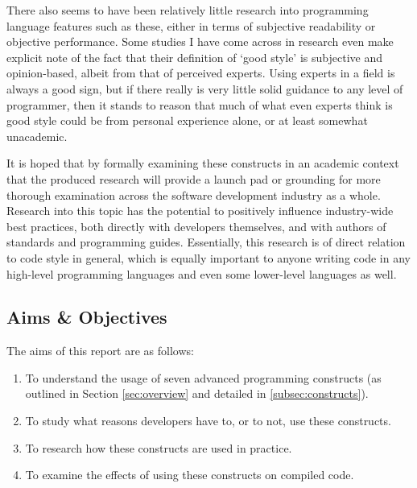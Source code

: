 \documentclass{article}
\begin{document}
        There also seems to have been relatively little research into programming language features such as these, either in terms of subjective readability or objective performance. Some studies I have come across in research even make explicit note of the fact that their definition of `good style' is subjective and opinion-based, albeit from that of perceived experts. Using experts in a field is always a good sign, but if there really is very little solid guidance to any level of programmer, then it stands to reason that much of what even experts think is good style could be from personal experience alone, or at least somewhat unacademic.
        
        It is hoped that by formally examining these constructs in an academic context that the produced research will provide a launch pad or grounding for more thorough examination across the software development industry as a whole. Research into this topic has the potential to positively influence industry-wide best practices, both directly with developers themselves, and with authors of standards and programming guides. Essentially, this research is of direct relation to code style in general, which is equally important to anyone writing code in any high-level programming languages and even some lower-level languages as well.
    \subsection{Aims \& Objectives}
    \label{subsec:aimsAndObjs}
        The aims of this report are as follows:
        \begin{enumerate}
            \item To understand the usage of seven advanced programming constructs (as outlined in Section \ref{sec:overview} and detailed in \ref{subsec:constructs}).
            \item To study what reasons developers have to, or to not, use these constructs.
            \item To research how these constructs are used in practice.
            \item To examine the effects of using these constructs on compiled code.
        \end{enumerate}
        \hspace*{1cm}\newline
\end{document}
